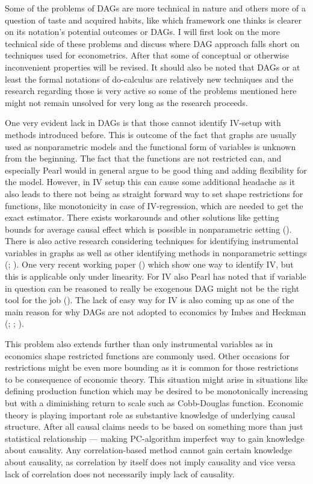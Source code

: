 \documentclass[main=english,12pt,a4paper,pdftex,econ,utf8]{aaltothesis}
\begin{document}
Some of the problems of DAGs are more technical in nature and others more of a question of taste and acquired habits, like which framework one thinks is clearer on its notation's potential outcomes or DAGs. I will first look on the more technical side of these problems and discuss where DAG approach falls short on techniques used for econometrics. After that some of conceptual or otherwise inconvenient properties will be revised. It should also be noted that DAGs or at least the formal notations of do-calculus are relatively new techniques and the research regarding those is very active so some of the problems mentioned here might not remain unsolved for very long as the research proceeds.

One very evident lack in DAGs is that those cannot identify IV-setup with methods introduced before. This is outcome of the fact that graphs are usually used as nonparametric models and the functional form of variables is unknown from the beginning. The fact that the functions are not restricted can, and especially Pearl would in general argue to be good thing and adding flexibility for the model. However, in IV setup this can cause some additional headache as it also leads to there not being as straight forward way to set shape restrictions for functions, like monotonicity in case of IV-regression, which are needed to get the exact estimator. There exists workarounds and other solutions like getting bounds for average causal effect which is possible in nonparametric setting (\cite{Balke1997}). There is also active research considering techniques for identifying instrumental variables in graphs as well as other identifying methods in nonparametric settings (\cite{Freyberger2017}; \cite{Freyberger2015}). One very recent working paper (\cite{Hoveid2021}) which show one way to identify IV, but this is applicable only under linearity. For IV also Pearl has noted that if variable in question can be reasoned to really be exogenous DAG might not be the right tool for the job (\cite{PearlMackenzie18}). The lack of easy way for IV is also coming up as one of the main reason for why DAGs are not adopted to economics by Imbes and Heckman (\cite{Imbens2014}; \cite{imbes2020}; \cite{Heckman2015}).

This problem also extends further than only instrumental variables as in economics shape restricted functions are commonly used. Other occasions for restrictions might be even more bounding as it is common for those restrictions to be consequence of economic theory. This situation might arise in situations like defining production function which may be desired to be monotonically increasing but with a diminishing return to scale such as Cobb-Douglas function. Economic theory is playing important role as substantive knowledge of underlying causal structure. After all causal claims needs to be based on something more than just statistical relationship --- making PC-algorithm imperfect way to gain knowledge about causality. Any correlation-based method cannot gain certain knowledge about causality, as correlation by itself does not imply causality and vice versa lack of correlation does not necessarily imply lack of causality.
\end{document}

